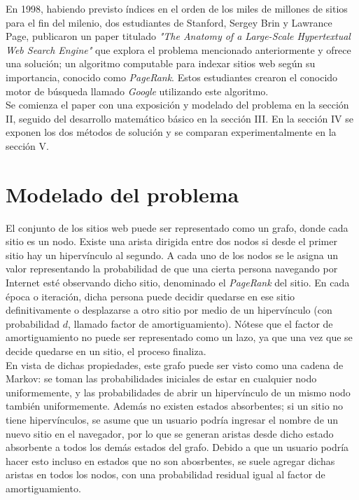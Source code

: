 \documentclass[%
    final,
    notitlepage,
    narroweqnarray,
    inline,
    twoside,
    invited
    ]{ieee}
\begin{document}
En 1998, habiendo previsto índices en el orden
de los miles de millones de sitios para el fin del milenio, dos estudiantes de Stanford, Sergey Brin y Lawrance Page, publicaron un paper titulado
\textit{"The Anatomy of a Large-Scale Hypertextual Web Search Engine"} que explora el problema mencionado anteriormente y ofrece una solución; un
algoritmo computable para indexar sitios web según su importancia, conocido como \textit{PageRank}. Estos estudiantes crearon el conocido motor de
búsqueda llamado \textit{Google} utilizando este algoritmo. \\

Se comienza el paper con una exposición y modelado del problema en la sección II, seguido del desarrollo matemático básico en la sección III.
En la sección IV se exponen los dos métodos de solución y se comparan experimentalmente en la sección V.


\section{Modelado del problema}

\par El conjunto de los sitios web puede ser representado como un grafo, donde cada sitio es un nodo. Existe una arista dirigida entre dos nodos si
desde el primer sitio hay un hipervínculo al segundo. A cada uno de los nodos se le asigna un valor representando la probabilidad de que
una cierta persona navegando por Internet esté observando dicho sitio, denominado el \textit{PageRank} del sitio.
En cada época o iteración, dicha persona puede decidir quedarse en ese sitio definitivamente o desplazarse a otro sitio por medio de un hipervínculo
(con probabilidad $d$, llamado factor de amortiguamiento).
Nótese que el factor de amortiguamiento no puede ser representado como un lazo, ya que una vez que se decide quedarse en un sitio, el proceso finaliza.\\

En vista de dichas propiedades, este grafo puede ser visto como una cadena de Markov: se toman las probabilidades iniciales de
estar en cualquier nodo uniformemente, y las probabilidades de abrir un hipervínculo de un mismo nodo también uniformemente. Además no existen
estados absorbentes; si un sitio no tiene hipervínculos, se asume que un usuario podría ingresar el nombre de un nuevo sitio en el navegador, por lo que
se generan aristas desde dicho estado absorbente a todos los demás estados del grafo. Debido a que un usuario podría hacer esto incluso en estados
que no son abosrbentes, se suele agregar dichas aristas en todos los nodos, con una probabilidad residual igual al factor de amortiguamiento.\\
\end{document}
